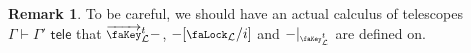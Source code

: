 \documentclass[10pt]{article}
\theoremstyle{definition}
\newtheorem{remark}[theorem]{Remark}
\newcommand{\yields}{\vdash}
\newcommand{\tele}{\,\,\mathsf{tele}}
\newcommand{\lock}{\mathchoice
{\scalebox{0.8}{\text{\faLock}}}
{\scalebox{0.8}{\text{\faLock}}}
{\scalebox{0.5}{\text{\faLock}}}
{\scalebox{0.4}{\text{\faLock}}}
}
\newcommand{\key}{\mathchoice
{\scalebox{0.8}{\text{\faKey}}}
{\scalebox{0.8}{\text{\faKey}}}
{\scalebox{0.5}{\text{\faKey}}}
{\scalebox{0.4}{\text{\faKey}}}
}
\newcommand{\lockn}[1]{\mathcal{#1}}
\newcommand{\varkey}[2]{\key_{\lockn{#1}}^{#2}}
\newcommand{\admkeye}[2]{\overrightarrow{\key}_{#1}^{#2}}
\newcommand{\locksub}[2]{\lock_{\lockn{#1}}/#2}
\begin{document}
\begin{remark}
To be careful, we should have an actual calculus of telescopes $\Gamma \yields \Gamma' \tele$ that $\admkeye{\lockn{L}}{t} -$, $-[\locksub{L}{i}]$ and $-|_{\varkey{L}{t}}$ are defined on.
\end{remark}

\end{document}
